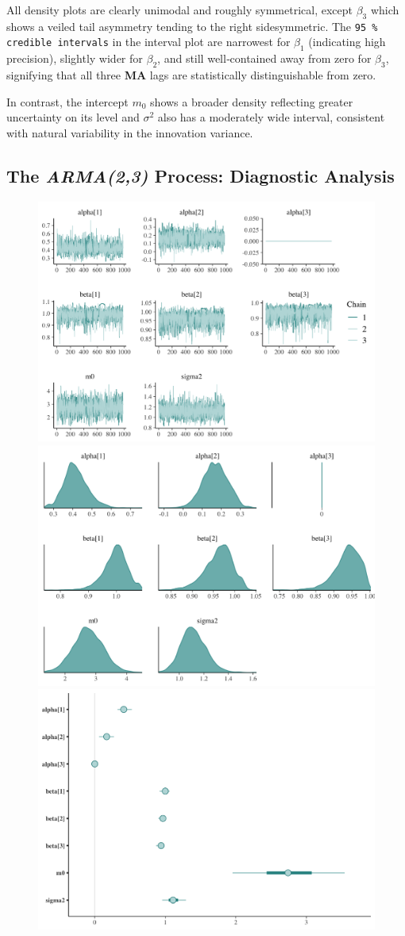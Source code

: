 \documentclass{Configuration_Files/PoliMi3i_thesis}
\begin{document}
All density plots are clearly unimodal and roughly symmetrical, except \(\beta_3\) which shows a veiled tail asymmetry tending to the right sidesymmetric. The \texttt{95 \% credible intervals} in the interval plot are narrowest for \(\beta_1\) (indicating high precision), slightly wider for \(\beta_2\), and still well‐contained away from zero for \(\beta_3\), signifying that all three \textbf{\textbf{MA}} lags are statistically distinguishable from zero. 

In contrast, the intercept \(m_0\) shows a broader density reflecting greater uncertainty on its level and \(\sigma^2\) also has a moderately wide interval, consistent with natural variability in the innovation variance.

\subsection{The \textbf{\textit{ARMA(2,3)}} Process: Diagnostic Analysis}
\begin{figure}[H]
    \centering
    \includegraphics[width=0.62\linewidth]{ARMA_trace.png}
    \vspace{0.5em}
    
    \includegraphics[width=0.62\linewidth]{ARMA_density.png}
    \vspace{0.5em}
    
    \includegraphics[width=0.62\linewidth]{ARMA_interval.png}
\end{figure}
\end{document}

